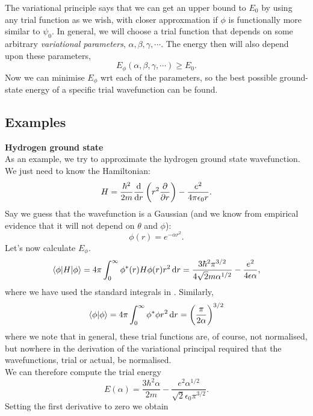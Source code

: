 The variational principle says that we can get an upper bound to $E_0$ by using 
any trial function as we wish, with closer approxmation if $\phi$ is functionally 
more similar to $\psi_0$. In general, we will choose a trial function that 
depends on some arbitrary \textit{variational parameters}, $\alpha,\beta,\gamma,\cdots$. The energy then will also depend upon these parameters, \ie
\begin{equation}
E_{\phi}(\alpha,\beta,\gamma,\cdots)\geq E_0.
\end{equation}
Now we can minimise $E_{\phi}$ wrt each of the parameters, so the best possible 
ground-state energy of a specific trial wavefunction can be found.
\subsection{Examples}
\textbf{Hydrogen ground state}\\
As an example, we try to approximate the hydrogen ground state wavefunction. We just need to know the Hamiltonian:
\begin{equation}
H=\frac{\hbar^2}{2m}\diff{}{r}\lf(r^2\diffp{}{r} \rt)-\frac{e^2}{4\pi\epsilon_0r}.
\end{equation}
Say we guess that the wavefunction is a Gaussian (and we know from empirical 
evidence that it will not depend on $\theta$ and $\phi$):
\begin{equation}
\phi(r)=e^{-\alpha r^2}.
\end{equation}
Let's now calculate $E_{\phi}$.
\begin{equation}
\lgl \phi|H|\phi\rgl=4\pi\intinfp\phi^*(r)H\phi(r)r^2\dif r=\frac{3\hbar^2\pi^{3/2}}{4\sqrt{2}m\alpha^{1/2}}-\frac{e^2}{4\epsilon\alpha},
\end{equation}
where we have used the standard integrals in . Similarly, 
\begin{equation}
\lgl \phi|\phi\rgl=4\pi\intinfp\phi^*\phi r^2\dif r=\lf(\frac{\pi}{2\alpha} \rt)^{3/2}
\end{equation}
where we note that in general, these trial functions are, of course, not 
normalised, but nowhere in the derivation of the variational principal required 
that the wavefunctions, trial or actual, be normalised. \\
We can therefore compute the trial energy
\begin{equation}
E(\alpha)=\frac{3\hbar^2\alpha}{2m}-\frac{e^2\alpha^{1/2}}{\sqrt{2}\epsilon_0\pi^{3/2}}.
\end{equation}
Setting the first derivative to zero we obtain
